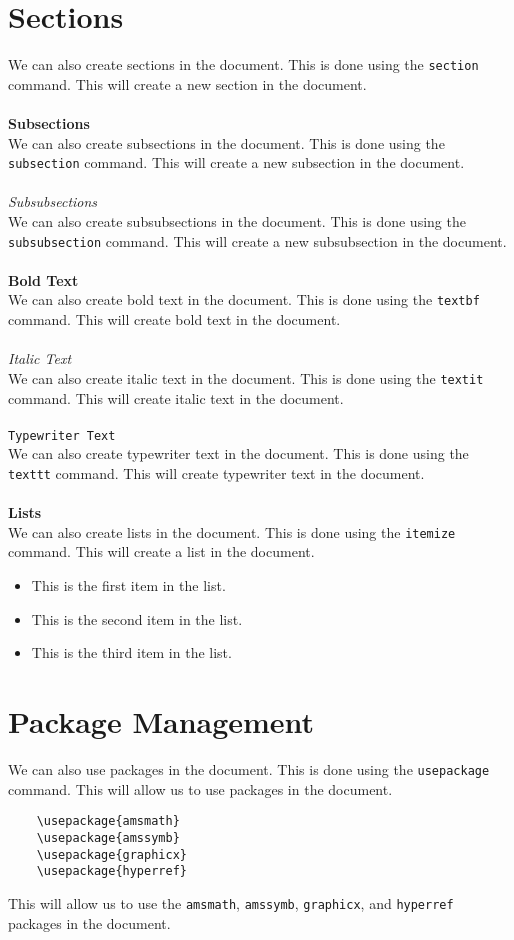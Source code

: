 \documentclass[10pt]{article}
\begin{document}
\section{Sections}
We can also create sections in the document. This is done using the \texttt{section} command. This will create a new section in the document.\\\\
\textbf{Subsections}\\
We can also create subsections in the document. This is done using the \texttt{subsection} command. This will create a new subsection in the document.\\\\
\textit{Subsubsections}\\
We can also create subsubsections in the document. This is done using the \texttt{subsubsection} command. This will create a new subsubsection in the document.\\\\
\textbf{Bold Text}\\
We can also create bold text in the document. This is done using the \texttt{textbf} command. This will create bold text in the document.\\\\
\textit{Italic Text}\\
We can also create italic text in the document. This is done using the \texttt{textit} command. This will create italic text in the document.\\\\
\texttt{Typewriter Text}\\
We can also create typewriter text in the document. This is done using the \texttt{texttt} command. This will create typewriter text in the document.\\\\
\textbf{Lists}\\
We can also create lists in the document. This is done using the \texttt{itemize} command. This will create a list in the document.\\
\begin{itemize}
    \item This is the first item in the list.
    \item This is the second item in the list.
    \item This is the third item in the list.
\end{itemize}
\newpage
\section{Package Management}
We can also use packages in the document. This is done using the \texttt{usepackage} command. This will allow us to use packages in the document.\\
\begin{verbatim}
    \usepackage{amsmath}
    \usepackage{amssymb}
    \usepackage{graphicx}
    \usepackage{hyperref}
\end{verbatim}
This will allow us to use the \texttt{amsmath}, \texttt{amssymb}, \texttt{graphicx}, and \texttt{hyperref} packages in the document.\\
\end{document}

